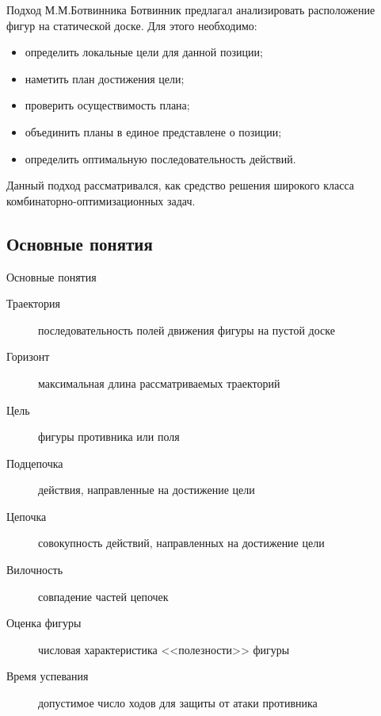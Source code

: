 \begin{frame}{Подход М.М.Ботвинника}
Ботвинник предлагал анализировать расположение фигур на статической доске. Для этого необходимо: 
\begin{itemize}
\item определить локальные цели для данной позиции;
\item наметить план достижения цели;
\item проверить осуществимость плана;
\item объединить планы в единое представлене о позиции;
\item определить оптимальную последовательность действий.
\end{itemize}
Данный подход рассматривался, как средство решения широкого класса комбинаторно-оптимизационных задач.
\end{frame}

\subsection{Основные понятия}
\begin{frame}{Основные понятия}
\begin{description}
\item[Траектория] последовательность полей движения фигуры на пустой доске
\item[Горизонт] максимальная длина рассматриваемых траекторий
\item[Цель] фигуры противника или поля
\item[Подцепочка] действия, направленные на достижение цели
\item[Цепочка] совокупность действий, направленных на достижение цели
\item[Вилочность] совпадение частей цепочек
\item[Оценка фигуры] числовая характеристика <<полезности>> фигуры
\item[Время успевания] допустимое число ходов для защиты от атаки противника
\end{description}
\end{frame}

